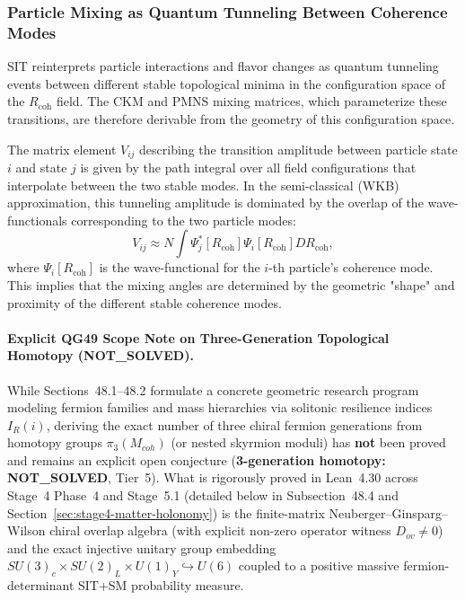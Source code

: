 \documentclass[american,11pt,letterpaper]{article}
\def\mathcal#1{#1}%
\def\mathrm#1{#1}%
\def\texttt#1{#1}%
\def\emph#1{#1}%
\begin{document}
\subsubsection{Particle Mixing as Quantum Tunneling Between Coherence Modes}

SIT reinterprets particle interactions and flavor changes as quantum tunneling events between different stable topological minima in the configuration space of the $R_{\text{coh}}$ field. The CKM and PMNS mixing matrices, which parameterize these transitions, are therefore derivable from the geometry of this configuration space.

The matrix element $V_{ij}$ describing the transition amplitude between particle state $i$ and state $j$ is given by the path integral over all field configurations that interpolate between the two stable modes. In the semi-classical (WKB) approximation, this tunneling amplitude is dominated by the overlap of the wave-functionals corresponding to the two particle modes:
\begin{equation}
    V_{ij} \approx \mathcal{N} \int \Psi_j^*[R_{\text{coh}}] \Psi_i[R_{\text{coh}}] \mathcal{D}R_{\text{coh}},
    \label{eq:mixing_overlap_integral_consolidated}
\end{equation}
where $\Psi_i[R_{\text{coh}}]$ is the wave-functional for the $i$-th particle's coherence mode. This implies that the mixing angles are determined by the geometric "shape" and proximity of the different stable coherence modes.


\paragraph{Explicit \texttt{QG49} Scope Note on Three-Generation Topological Homotopy (\texttt{NOT\_SOLVED}).}
While Sections~48.1--48.2 formulate a concrete geometric research program modeling fermion families and mass hierarchies via solitonic resilience indices $I_R(i)$, deriving the exact number of three chiral fermion generations from homotopy groups $\pi_3(\mathcal{M}_{\mathrm{coh}})$ (or nested skyrmion moduli) has \textbf{not} been proved and remains an explicit open conjecture (\textbf{\texttt{3-generation homotopy: NOT\_\allowbreak{}SOLVED}}, Tier~5). What \emph{is} rigorously proved in Lean~4.30 across Stage~4 Phase~4 and Stage~5.1 (detailed below in Subsection~48.4 and Section~\ref{sec:stage4-matter-holonomy}) is the finite-matrix Neuberger--Ginsparg--Wilson chiral overlap algebra (with explicit non-zero operator witness $D_{\mathrm{ov}} \ne 0$) and the exact injective unitary group embedding $SU(3)_c \times SU(2)_L \times U(1)_Y \hookrightarrow U(6)$ coupled to a positive massive fermion-determinant SIT+SM probability measure.
\end{document}
